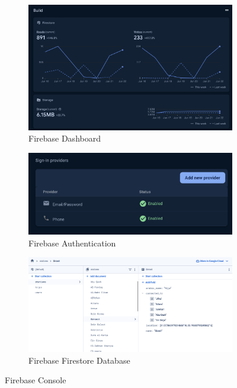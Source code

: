 \documentclass[a4paper, 12pt]{report} %
\begin{document}
            \begin{figure}[H]
                \centering
                \begin{subfigure}{0.7\textwidth}
                    \includegraphics[width=\linewidth]{Images/firebase_dashboard.png}
                    \caption{Firebase Dashboard}
                    \label{fig:firebase_dashboard}
                \end{subfigure}
                \begin{subfigure}{0.7\textwidth}
                    \includegraphics[width=\linewidth]{Images/firebase_auth.png}
                    \caption{Firebase Authentication}
                    \label{fig:firebase_auth}
                \end{subfigure}
                \begin{subfigure}{0.7\textwidth}
                    \includegraphics[width=\linewidth]{Images/firestore.png}
                    \caption{Firebase Firestore Database}
                    \label{fig:firebase_database}
                \end{subfigure}
                \caption{Firebase Console}
                \label{fig:firebase_setup}
            \end{figure}
\end{document}
